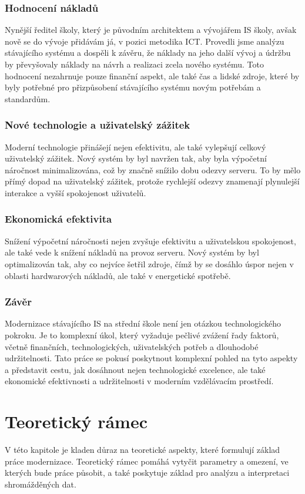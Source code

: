 \documentclass[FM,Proj]{tulthesis}
\begin{document}
\subsection*{Hodnocení nákladů}
Nynější ředitel školy, který je původním architektem a vývojářem IS školy, avšak nově
se do vývoje přidávám já, v pozici metodika ICT. Provedli jsme analýzu stávajícího systému
a dospěli k závěru, že náklady na jeho další vývoj a údržbu by převyšovaly náklady na 
návrh a realizaci zcela nového systému. Toto hodnocení nezahrnuje pouze finanční aspekt,
ale také čas a lidské zdroje, které by byly potřebné pro přizpůsobení stávajícího systému
 novým potřebám a standardům.

\subsection*{Nové technologie a uživatelský zážitek}
Moderní technologie přinášejí nejen efektivitu, ale také vylepšují celkový uživatelský zážitek.
Nový systém by byl navržen tak, aby byla výpočetní náročnost minimalizována, což by značně 
snížilo dobu odezvy serveru. To by mělo přímý dopad na uživatelský zážitek, protože 
rychlejší odezvy znamenají plynulejší interakce a vyšší spokojenost uživatelů.

\subsection*{Ekonomická efektivita}
Snížení výpočetní náročnosti nejen zvyšuje efektivitu a uživatelskou spokojenost, ale 
také vede k snížení nákladů na provoz serveru. Nový systém by byl optimalizován tak, 
aby co nejvíce šetřil zdroje, čímž by se dosáhlo úspor nejen v oblasti hardwarových nákladů,
ale také v energetické spotřebě.

\subsection*{Závěr}
Modernizace stávajícího IS na střední škole není jen otázkou technologického pokroku.
Je to komplexní úkol, který vyžaduje pečlivé zvážení řady faktorů, včetně finančních, 
technologických, uživatelských potřeb a dlouhodobé udržitelnosti. Tato práce se pokusí 
poskytnout komplexní pohled na tyto aspekty a představit cestu, jak dosáhnout nejen 
technologické excelence, ale také ekonomické efektivnosti a udržitelnosti v moderním 
vzdělávacím prostředí.

\chapter{Teoretický rámec}
V této kapitole je kladen důraz na teoretické aspekty, které formulují základ práce 
modernizace. Teoretický rámec pomáhá vytyčit parametry a omezení, ve kterých bude 
práce působit, a také poskytuje základ pro analýzu a interpretaci shromážděných dat. 
\end{document}
